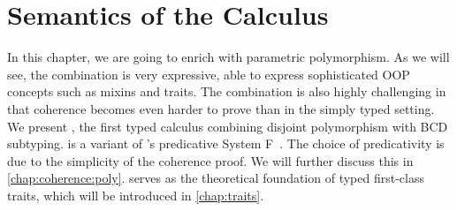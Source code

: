 
\chapter{Semantics of the \fnamee Calculus}
\label{chap:fi}

In this chapter, we are going to enrich \namee with parametric polymorphism. As
we will see, the combination is very expressive, able to express sophisticated
OOP concepts such as mixins and traits. The combination is also highly
challenging in that coherence becomes even harder to prove than in the simply
typed setting. We present \fnamee, the first typed calculus combining disjoint
polymorphism with BCD subtyping. \fnamee is a variant of
\citeauthor{leivant1991finitely}'s predicative System
F~\citep{leivant1991finitely}. The choice of predicativity is due to the
simplicity of the coherence proof. We will further discuss this in
\cref{chap:coherence:poly}. \fnamee serves as the theoretical foundation of
typed first-class traits, which will be introduced in \cref{chap:traits}.












